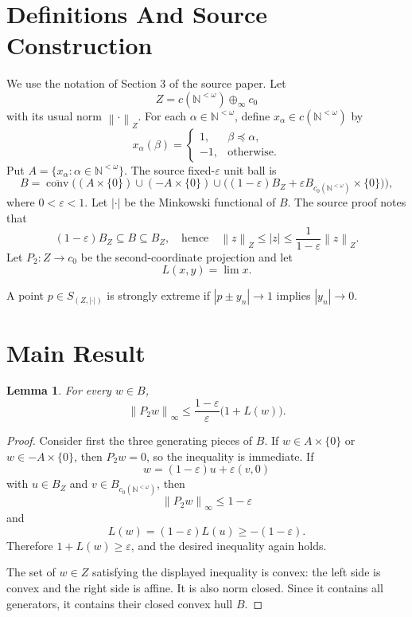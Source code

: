 \documentclass[11pt]{article}
\newtheorem{lemma}{Lemma}
\newcommand{\N}{\mathbb{N}}
\newcommand{\eps}{\varepsilon}
\newcommand{\conv}{\operatorname{conv}}
\newcommand{\norm}[1]{\left\lVert #1 \right\rVert}
\newcommand{\abs}[1]{\left\lvert #1 \right\rvert}
\begin{document}
\section*{Definitions And Source Construction}

We use the notation of Section 3 of the source paper.  Let
\[
Z=c(\N^{<\omega})\oplus_\infty c_0
\]
with its usual norm \(\norm{\cdot}_Z\).  For each
\(\alpha\in\N^{<\omega}\), define \(x_\alpha\in c(\N^{<\omega})\) by
\[
x_\alpha(\beta)=
\begin{cases}
1, & \beta\preceq \alpha,\\
-1, & \text{otherwise}.
\end{cases}
\]
Put \(A=\{x_\alpha:\alpha\in\N^{<\omega}\}\).  The source fixed-\(\eps\)
unit ball is
\[
B=\overline{\conv}\Big( (A\times\{0\})\cup (-A\times\{0\})\cup
\big((1-\eps)B_Z+\eps B_{c_0(\N^{<\omega})}\times\{0\}\big)\Big),
\]
where \(0<\eps<1\).  Let \(\abs{\cdot}\) be the Minkowski functional of \(B\).
The source proof notes that
\[
(1-\eps)B_Z\subseteq B\subseteq B_Z,
\quad\text{hence}\quad
\norm{z}_Z\leq \abs{z}\leq \frac{1}{1-\eps}\norm{z}_Z.
\]
Let \(P_2:Z\to c_0\) be the second-coordinate projection and let
\[
L(x,y)=\lim x.
\]

A point \(p\in S_{(Z,\abs{\cdot})}\) is strongly extreme if
\(\abs{p\pm y_n}\to 1\) implies \(\abs{y_n}\to 0\).

\section*{Main Result}

\begin{lemma}\label{lem:second-coordinate-bound}
For every \(w\in B\),
\[
\norm{P_2 w}_\infty
\leq
\frac{1-\eps}{\eps}\bigl(1+L(w)\bigr).
\]
\end{lemma}

\begin{proof}
Consider first the three generating pieces of \(B\).
If \(w\in A\times\{0\}\) or \(w\in -A\times\{0\}\), then
\(P_2w=0\), so the inequality is immediate.  If
\[
w=(1-\eps)u+\eps(v,0)
\]
with \(u\in B_Z\) and \(v\in B_{c_0(\N^{<\omega})}\), then
\[
\norm{P_2w}_\infty\leq 1-\eps
\]
and
\[
L(w)=(1-\eps)L(u)\geq -(1-\eps).
\]
Therefore \(1+L(w)\geq \eps\), and the desired inequality again holds.

The set of \(w\in Z\) satisfying the displayed inequality is convex: the left
side is convex and the right side is affine.  It is also norm closed.  Since it
contains all generators, it contains their closed convex hull \(B\).
\end{proof}
\end{document}
